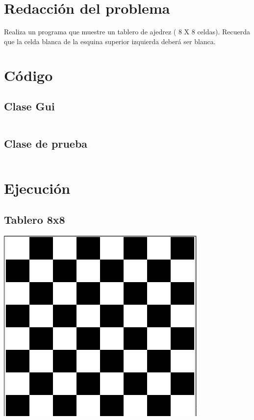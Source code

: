 \documentclass[12pt]{article}
\author{Pablo Vargas Bermudez}
\begin{document}
\pagestyle{empty}

\section*{Redacción del problema}

Realiza un programa que muestre un tablero de ajedrez ( 8 X 8
celdas). Recuerda que la celda blanca de la esquina superior izquierda
deberá ser blanca.

\section*{Código}

\subsection*{Clase Gui}

\inputminted{Java}{Gui.java}

\subsection*{Clase de prueba}

\inputminted{Java}{Prueba.java}

\section*{Ejecución}

\subsection*{Tablero 8x8}

\includegraphics[width=\textwidth]{Corrida1.png}
\end{document}
